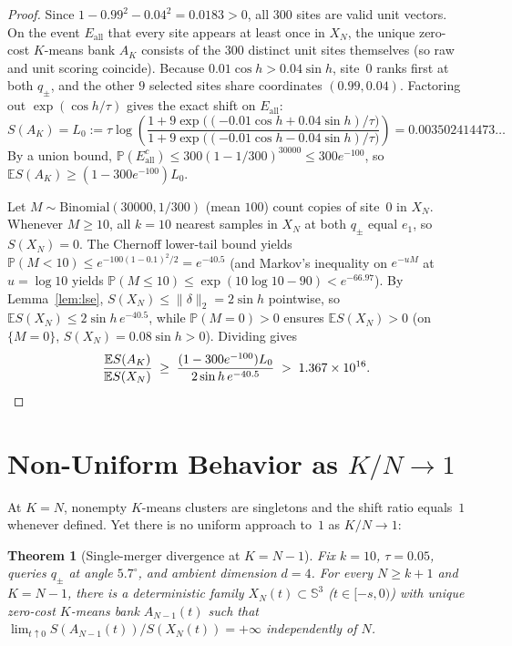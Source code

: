 \documentclass[11pt]{article}
\theoremstyle{plain}
\newtheorem{theorem}{Theorem}
\theoremstyle{definition}
\theoremstyle{remark}
\begin{document}
\begin{proof}
Since $1 - 0.99^2 - 0.04^2 = 0.0183 > 0$, all $300$ sites are valid unit vectors. On the event $E_{\mathrm{all}}$ that every site appears at least once in $X_N$, the unique zero-cost $K$-means bank $A_K$ consists of the $300$ distinct unit sites themselves (so raw and unit scoring coincide). Because $0.01\cos h > 0.04\sin h$, site~$0$ ranks first at both $q_\pm$, and the other $9$ selected sites share coordinates $(0.99, 0.04)$. Factoring out $\exp(\cos h / \tau)$ gives the exact shift on $E_{\mathrm{all}}$:
\[
S(A_K) = L_0 := \tau\log\!\left(\frac{1 + 9\exp\bigl((-0.01\cos h + 0.04\sin h)/\tau\bigr)}{1 + 9\exp\bigl((-0.01\cos h - 0.04\sin h)/\tau\bigr)}\right) = 0.003502414473\ldots
\]
By a union bound, $\mathbb{P}(E_{\mathrm{all}}^c) \le 300(1 - 1/300)^{30000} \le 300 e^{-100}$, so $\mathbb{E}S(A_K) \ge (1 - 300 e^{-100}) L_0$.

Let $M \sim \mathrm{Binomial}(30000, 1/300)$ (mean $100$) count copies of site~$0$ in $X_N$. Whenever $M \ge 10$, all $k = 10$ nearest samples in $X_N$ at both $q_\pm$ equal $e_1$, so $S(X_N) = 0$. The Chernoff lower-tail bound yields $\mathbb{P}(M < 10) \le e^{-100(1 - 0.1)^2/2} = e^{-40.5}$ (and Markov's inequality on $e^{-uM}$ at $u = \log 10$ yields $\mathbb{P}(M \le 10) \le \exp(10\log 10 - 90) < e^{-66.97}$). By Lemma~\ref{lem:lse}, $S(X_N) \le \|\delta\|_2 = 2\sin h$ pointwise, so $\mathbb{E}S(X_N) \le 2\sin h\, e^{-40.5}$, while $\mathbb{P}(M = 0) > 0$ ensures $\mathbb{E}S(X_N) > 0$ (on $\{M = 0\}$, $S(X_N) = 0.08\sin h > 0$). Dividing gives
\[
\frac{\mathbb{E}S(A_K)}{\mathbb{E}S(X_N)} \;\ge\; \frac{(1 - 300 e^{-100}) L_0}{2\sin h\, e^{-40.5}} \;>\; 1.367 \times 10^{16}. \qedhere
\]
\end{proof}

\section{Non-Uniform Behavior as \texorpdfstring{$K / N \to 1$}{K/N -> 1}}

At $K = N$, nonempty $K$-means clusters are singletons and the shift ratio equals~$1$ whenever defined. Yet there is no uniform approach to~$1$ as $K/N \to 1$:

\begin{theorem}[Single-merger divergence at $K = N - 1$]\label{thm:single-merge}
Fix $k = 10$, $\tau = 0.05$, queries $q_\pm$ at angle $5.7^\circ$, and ambient dimension $d = 4$. For every $N \ge k + 1$ and $K = N - 1$, there is a deterministic family $X_N(t) \subset \mathbb{S}^3$ ($t \in [-s, 0)$) with unique zero-cost $K$-means bank $A_{N-1}(t)$ such that $\lim_{t \uparrow 0} S(A_{N-1}(t))/S(X_N(t)) = +\infty$ independently of $N$.
\end{theorem}
\end{document}
